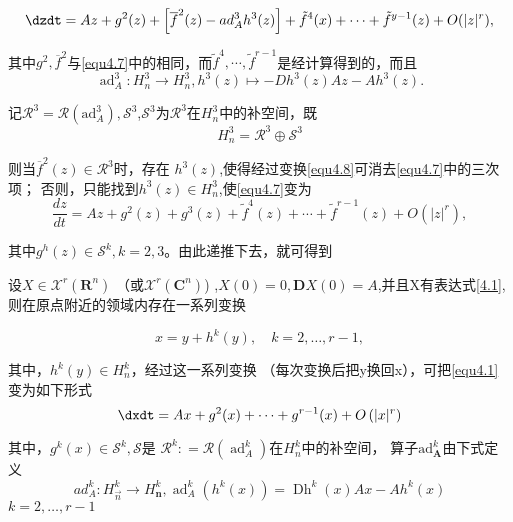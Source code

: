 \begin{equation}
    \label{eq:1.4.9}
 \dzdt= A z + g ^ { 2 } ( z ) +
  \left[ \overline { f } ^ { 2 } ( z ) - a d _ { A } ^ { 3 } h ^ { 3 } ( z ) \right] + \tilde { f } ^ { 4 } ( x ) +
  \cdots + \tilde { f } ^ { y - 1 } ( z ) + O ( | z |^ r ),
\end{equation}

其中\(g^2,\overline{f}^2\)与\ref{equ4.7}中的相同，而$\widetilde { f } ^ { 4 } , \cdots , \tilde { f } ^ { r - 1 }$是经计算得到的，而且
\[
\operatorname { ad } _ { A } ^ { 3 }:H _ { n } ^ { 3 } \rightarrow H _ { n } ^ { 3 },h ^ { 3 } ( z ) \mapsto - D h ^ { 3 } ( z ) A z - A h ^ { 3 } ( z ).
\]

记$\mathscr { R } ^ { 3 } = \mathscr { R } \left( \mathrm { ad } _ { A } ^ { 3 } \right) , \mathscr { S } ^ { 3 }$,\(\mathscr{S}^3\)为\(\mathscr{R}^3\)在\(H_n^3\)中的补空间，既
\[
H _ { n } ^ { 3 } = \mathscr { R } ^ { 3 } \oplus \mathscr S ^ { 3 }
\]

则当$\overline { f} ^ { 2 } ( z )  \in \mathscr { R } ^ { 3 }$时，存在
\(h^3(z)\),使得经过变换\ref{equ4.8}可消去\ref{equ4.7}中的三次项；
否则，只能找到$h ^ { 3 } ( z ) \in H _ { n } ^ { 3 }$,使\ref{equ4.7}变为
\[
\frac { d z } { d t } = A z + g ^ { 2 } ( z ) + g ^ { 3 } ( z ) + \tilde { f } ^ { 4 } ( z ) +\cdots + \tilde { f } ^ { r - 1 } ( z ) + O \left( | z | ^ { r } \right),
\]

其中$g ^ { h } ( z ) \in \mathscr { S } ^ { k } , k = 2,3$。由此递推下去，就可得到

\begin{theorem}
  设$X \in \mathscr { X } ^ { r } \left( \mathbf { R } ^ { n } \right)$
  （或$\mathscr { X } ^ { r } \left( \mathbf { C } ^ { n } \right) $) ,$ X ( 0 ) = 0 , \mathbf { D } X ( 0 )=A$,并且X有表达式\ref{4.1},则在原点附近的领域内存在一系列变换
  
  \begin{equation}
        \label{eq:1.4.10}
x = y + h ^ { k } ( y ) , \quad k = 2 , \dots , r - 1,
  \end{equation}

  其中，$h ^ { k } ( y ) \in H _ { n } ^ { k }$，经过这一系列变换
  （每次变换后把y换回x），可把\ref{equ4.1}变为如下形式
  \begin{equation}
        \label{eq:1.4.11}
\dxdt= A x + g ^ { 2 } ( x ) + \cdots + g ^ { r - 1 } ( x ) + O \left( | x | ^ { r } \right)
  \end{equation}

  其中，$g ^ { k } ( x ) \in \mathscr { S } ^ { k } , \mathscr { S }$是
  $\mathscr { R } ^ { k  }: = \mathscr { R } \left( \operatorname { ad } _ { A } ^ { k } \right)$在\(H_n^k\)中的补空间，
  算子$\mathrm { ad } _ { \boldsymbol { A } } ^ { k }$由下式定义
  \begin{equation}
        \label{eq:1.4.12}
    a d _ { A } ^ { k }:H _ { \vec { n } } ^ { k } \rightarrow H _ { \mathbf { n } } ^ { k },
    \operatorname { ad } _ { A } ^ { k } \left( h ^ { k } ( x ) \right) = \operatorname { Dh } ^ { k } ( x ) A x - A h ^ { k } ( x )
  \end{equation}
  $k = 2 , \dots , r - 1$
\end{theorem}

